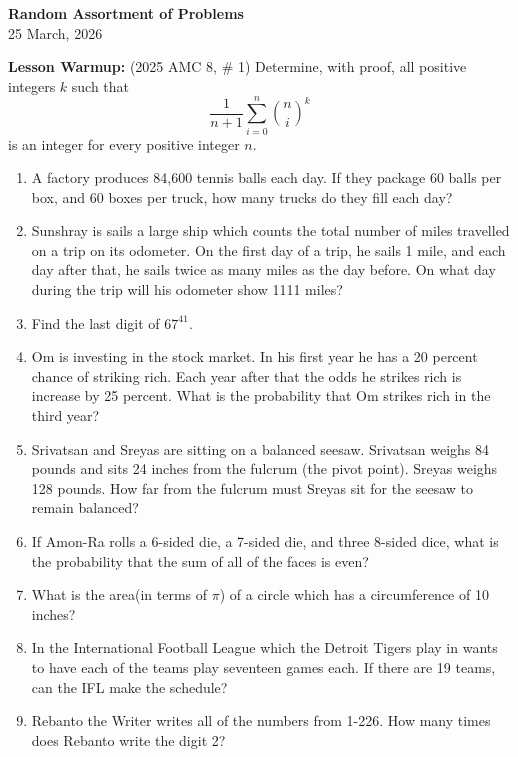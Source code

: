 \documentclass[a4paper]{article}
\begin{document}
\begin{center}
{\Large\bfseries Random Assortment of Problems}\\[0.25cm]
{\large 25 March, 2026}\\[1cm]
\end{center}

\noindent \textbf{Lesson Warmup:} (2025 AMC 8, \# 1) Determine, with proof, all positive integers $k$ such that\[\frac{1}{n+1} \sum_{i=0}^n \binom{n}{i}^k\]is an integer for every positive integer $n.$

\vspace{.5cm}

\begin{enumerate}[itemsep=2cm]
    \item A factory produces 84,600 tennis balls each day. If they package 60 balls per box, and 60 boxes per truck, how many trucks do they fill each day?
    \item Sunshray is sails a large ship which counts the total number of miles travelled on a trip on its odometer. On the first day of a trip, he sails 1 mile, and each day after that, he sails twice as many miles as the day before. On what day during the trip will his odometer show 1111 miles?
    \item Find the last digit of $67^{41}$.
    \item Om is investing in the stock market. In his first year he has a 20 percent chance of striking rich. Each year after that the odds he strikes rich is increase by 25 percent. What is the probability that Om strikes rich in the third year?
    \item Srivatsan and Sreyas are sitting on a balanced seesaw. Srivatsan weighs 84 pounds and sits 24 inches from the fulcrum (the pivot point). Sreyas weighs 128 pounds. How far from the fulcrum must Sreyas sit for the seesaw to remain balanced?
    \item If Amon-Ra rolls a 6-sided die, a 7-sided die, and three 8-sided dice, what is the probability that the sum of all of the faces is even?
    \item What is the area(in terms of $\pi$) of a circle which has a circumference of 10 inches?
    \item In the International Football League which the Detroit Tigers play in wants to have each of the teams play seventeen games each. If there are 19 teams, can the IFL make the schedule?
    \item Rebanto the Writer writes all of the numbers from 1-226. How many times does Rebanto write the digit 2?

\end{enumerate}
\end{document}
